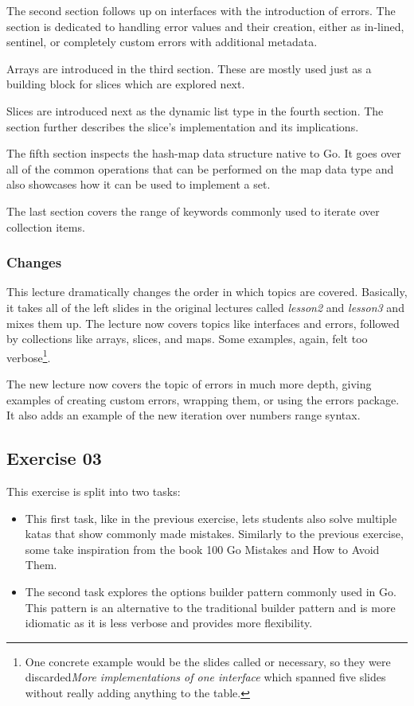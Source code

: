 \documentclass[
  digital,
  color,
  oneside,
  nosansbold,
  nocolorbold,
  nolof,
  nolot,
]{fithesis4}
\begin{document}
The second section follows up on interfaces with the introduction of errors. The section is dedicated to handling error values and their creation, either as in-lined, sentinel, or completely custom errors with additional metadata.

Arrays are introduced in the third section. These are mostly used just as a building block for slices which are explored next.

Slices are introduced next as the dynamic list type in the fourth section. The section further describes the slice's implementation and its implications.

The fifth section inspects the hash-map data structure native to Go. It goes over all of the common operations that can be performed on the map data type and also showcases how it can be used to implement a set. 

The last section covers the range of keywords commonly used to iterate over collection items.

\subsubsection{Changes}

This lecture dramatically changes the order in which topics are covered. Basically, it takes all of the left slides in the original lectures called \textit{lesson2} and \textit{lesson3} and mixes them up. The lecture now covers topics like interfaces and errors, followed by collections like arrays, slices, and maps. Some examples, again, felt too verbose\footnote{One concrete example would be the slides called or necessary, so they were discarded\textit{More implementations of one interface} which spanned five slides without really adding anything to the table.}.

The new lecture now covers the topic of errors in much more depth, giving examples of creating custom errors, wrapping them, or using the errors package. It also adds an example of the new iteration over numbers range syntax.

\subsection{Exercise 03}

This exercise is split into two tasks:
\begin{itemize}
    \item This first task, like in the previous exercise, lets students also solve multiple katas that show commonly made mistakes. Similarly to the previous exercise, some take inspiration from the book 100 Go Mistakes and How to Avoid Them\cite{100-go-mistakes}.
    \item The second task explores the options builder pattern commonly used in Go. This pattern is an alternative to the traditional builder pattern and is more idiomatic as it is less verbose and provides more flexibility.
\end{itemize}
\end{document}
